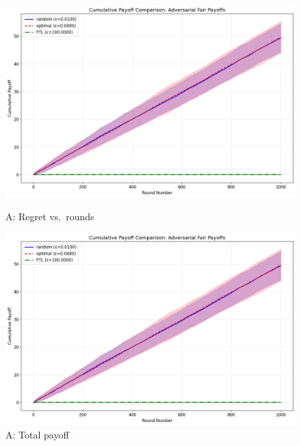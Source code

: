 \documentclass[10pt]{article}
\begin{document}
\begin{figure}[h!]
\centering
\begin{minipage}[t]{0.48\textwidth}
    \centering
    \includegraphics[width=\linewidth]{332Project2/figures/AFR_payoff.png}
    \caption*{\footnotesize A: Regret vs.\ rounds}
\end{minipage}\hfill
\begin{minipage}[t]{0.48\textwidth}
    \centering
    \includegraphics[width=\linewidth]{AFR_payoff.png}
    \caption*{\footnotesize A: Total payoff}
\end{minipage}
\end{figure}
\end{document}
